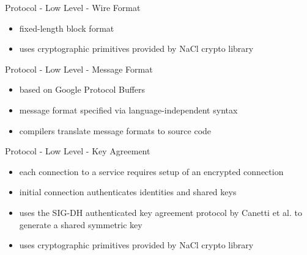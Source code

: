 \documentclass[a4paper]{beamer}
\begin{document}
\begin{frame}{Protocol - Low Level - Wire Format}
    \begin{figure}
    \centering

    \end{figure}
    \begin{itemize}
        \item fixed-length block format
        \item uses cryptographic primitives provided by NaCl crypto library \cite{nacl}
    \end{itemize}
\end{frame}

\begin{frame}{Protocol - Low Level - Message Format}
    \begin{itemize}
        \item based on Google Protocol Buffers \cite{varda2008protocol}
        \item message format specified via language-independent syntax
        \item compilers translate message formats to source code
    \end{itemize}
\end{frame}

\begin{frame}[fragile]{Protocol - Low Level - Key Agreement}
    \begin{itemize}
        \item each connection to a service requires setup of an encrypted connection
        \item initial connection authenticates identities and shared keys
        \item uses the SIG-DH authenticated key agreement protocol by Canetti et al. \cite{canetti2001analysis} to generate a shared symmetric key
        \item uses cryptographic primitives provided by NaCl crypto library \cite{nacl}
    \end{itemize}
\end{frame}
\end{document}
